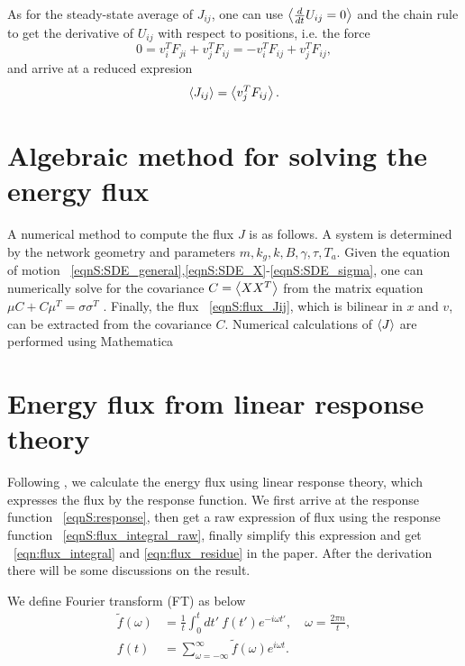 \documentclass[
 amsmath,amssymb,
 aps,
 pre,
 longbibliography,
 10pt, onecolumn,
 notitlepage
]{revtex4-1}
\begin{document}
As for the steady-state average of $J_{ij}$, one can use $\expval{\frac{d}{dt}U_{ij}=0}$ and the chain rule to get the derivative of $U_{ij}$ with respect to positions, i.e. the force
\begin{equation}
    0 = v_i^T F_{ji} + v_j^T F_{ij}
    = -v_i^T F_{ij} + v_j^T F_{ij},
\end{equation}
and arrive at a reduced expresion
\begin{equation}
    \expval{J_{ij}} = \expval{v_j^T F_{ij}}.
\end{equation}


\section{Algebraic method for solving the energy flux}
A numerical method to compute the flux $J$ is as follows.
A system is determined by the network geometry and parameters $m, k_g, k, B, \gamma, \tau, T_a$.
Given the equation of motion \eqnname~\eqref{eqnS:SDE_general},\eqref{eqnS:SDE_X}-\eqref{eqnS:SDE_sigma}, one can numerically solve for the covariance $C=\expval{XX^T}$ from the matrix equation $\mu C + C \mu^T = \sigma\sigma^T$ \cite{Gardiner2009ItoCalculus,Ceriotti2010ColoredNoiseThermostats}.
Finally, the flux \eqnname~\eqref{eqnS:flux_Jij}, which is bilinear in $x$ and $v$, can be extracted from the covariance $C$.
Numerical calculations of $\expval{J}$ are performed using Mathematica \cite{WolframResearch2018MathematicaVersion}


\section{Energy flux from linear response theory}
Following \cite{Kundu2011LargeDeviations}, we calculate the energy flux using linear response theory, which expresses the flux by the response function.
We first arrive at the response function \eqnname~\eqref{eqnS:response}, then get a raw expression of flux using the response function \eqnname~\eqref{eqnS:flux_integral_raw}, finally simplify this expression and get \eqnname~\eqref{eqn:flux_integral} and \eqref{eqn:flux_residue} in the paper.
After the derivation there will be some discussions on the result.

We define Fourier transform (FT) as below
\begin{align}
\tilde{f}(\omega) &= \frac{1}{t} \int_0^t dt'\ f(t')e^{-i\omega t'},\quad
\omega = \frac{2\pi n}{t} ,\\
f(t) &= \sum_{\omega=-\infty}^{\infty} \tilde{f}(\omega) e^{i\omega t} .
\end{align}
\end{document}
